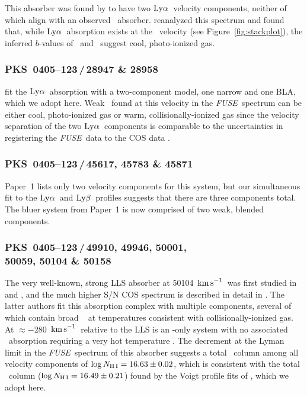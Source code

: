 \documentclass[twocolumn,twocolappendix,tighten,times]{aastex6}
\newcommand{\HI}{\ion{H}{1}}
\newcommand{\OVI}{\ion{O}{6}}
\newcommand{\fuse}{{\sl FUSE}}
\newcommand{\kms}{\ensuremath{{\rm km\,s}^{-1}}}
\newcommand{\lya}{\ensuremath{{\rm Ly}\alpha}}
\newcommand{\lyb}{\ensuremath{{\rm Ly}\beta}}
\begin{document}
This absorber was found by \citet{savage14} to have two \lya\ velocity
components, neither of which align with an observed
\OVI\ absorber. \citet{stocke14} reanalyzed this spectrum and found
that, while \lya\ absorption exists at the \OVI\ velocity (see 
Figure~\ref{fig:stackplot}), the inferred $b$-values of \HI\ and \OVI\ 
suggest cool, photo-ionized gas.


\subsubsection{PKS~0405--123\,/\,28947 \& 28958}
\label{indiv:absorbers:pks0405_28945}

\citet{savage14} fit the \lya\ absorption with a two-component model,
one narrow and one BLA, which we adopt here. Weak \OVI\ found at this 
velocity in the \fuse\ spectrum can be either cool, photo-ionized gas or warm,
collisionally-ionized gas since the velocity separation of the two
\lya\ components is comparable to the uncertainties in registering the
\fuse\ data to the COS data \citep[see also][]{stocke14}.


\subsubsection{PKS~0405--123\,/\,45617, 45783 \& 45871}
\label{indiv:absorbers:pks0405_45410}

Paper~1 lists only two velocity components for this system, but our simultaneous
fit to the \lya\ and \lyb\ profiles suggests that there are three components
total. The bluer system from Paper~1 is now comprised of two weak, blended components.


\subsubsection{PKS~0405--123\,/\,49910, 49946, 50001, \\ 50059, 50104 \& 50158}
\label{indiv:absorbers:pks0405_50104}

The very well-known, strong LLS absorber at 
50104~\kms\ was first studied in \citet{chen00} and \citet{prochaska04}, 
and the much higher S/N COS spectrum is described in detail in \citet{savage10}. 
The latter authors fit this absorption complex with multiple components, 
several of which contain broad \OVI\ \citep{tripp08, thom08} at temperatures
consistent with collisionally-ionized gas. At
$\approx -280$~\kms\ relative to the LLS is an \OVI-only system with
no associated \HI\ absorption requiring a very hot temperature
\citep[$\log{T}> 6.1$;][]{savage10}. The decrement at the Lyman limit in 
the \fuse\ spectrum of this absorber suggests a total \HI\ column among 
all velocity components of $\log{N_{\rm H\,I}}=16.63\pm0.02$, which is
consistent with the total \HI\ column ($\log{N_{\rm H\,I}}=16.49\pm0.21$) 
found by the Voigt profile fits of \citet{savage14}, which we adopt here.
\end{document}
